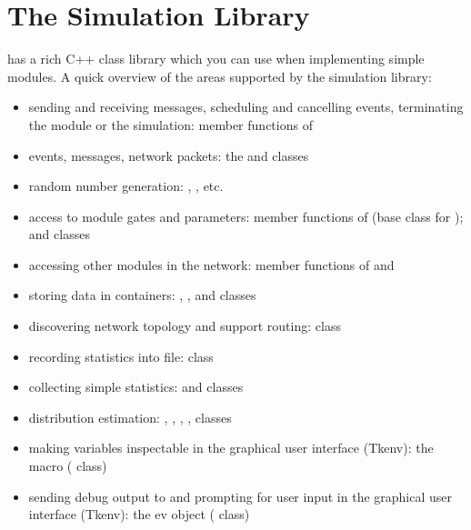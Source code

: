\chapter{The Simulation Library}
\label{cha:the-simulation-library}

{\opp} has a rich C++ class library which you can use when implementing 
simple modules. A quick overview of the areas supported by the 
simulation library:
\begin{itemize}
  \item{sending and receiving messages, scheduling and cancelling
    events, terminating the module or the simulation: member functions
    of }
  \item{events, messages, network packets: the
     and  classes}
  \item{random number generation: ,
    , etc.}
  \item{access to module gates and parameters: member functions of
     (base class for
    );  and
     classes}
  \item{accessing other modules in the network: member functions of  
    and }
  \item{storing data in containers: ,
    ,  and
     classes}
  \item{discovering network topology and support routing:  class}
  \item{recording statistics into file:  class}
  \item{collecting simple statistics:  and
     classes}
  \item{distribution estimation: ,
    ,
    , ,
     classes}
  \item{making variables inspectable in the graphical user interface 
    (Tkenv): the  macro ( class)}
  \item{sending debug output to and prompting for user input in the graphical 
    user interface (Tkenv): the ev object ( class)}
\end{itemize}





